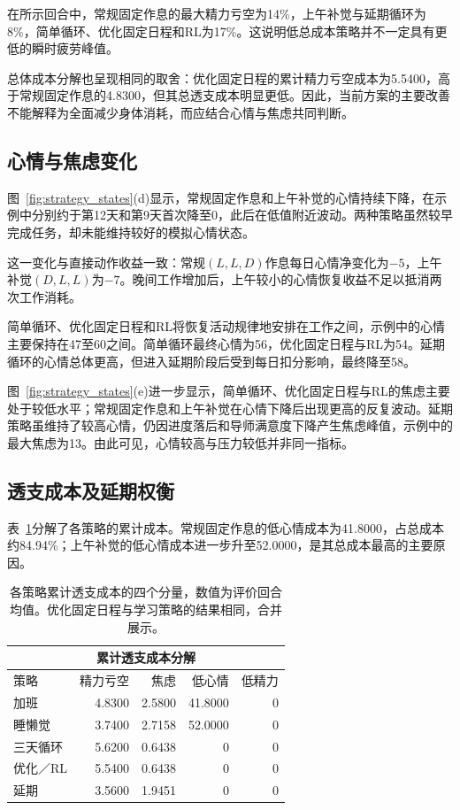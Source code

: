 \documentclass[journal]{IEEEtran}
\begin{document}
在所示回合中，常规固定作息的最大精力亏空为14\%，上午补觉与延期循环为8\%，简单循环、优化固定日程和RL为17\%。这说明低总成本策略并不一定具有更低的瞬时疲劳峰值。

总体成本分解也呈现相同的取舍：优化固定日程的累计精力亏空成本为5.5400，高于常规固定作息的4.8300，但其总透支成本明显更低。因此，当前方案的主要改善不能解释为全面减少身体消耗，而应结合心情与焦虑共同判断。

\subsection{心情与焦虑变化}

图~\ref{fig:strategy_states}(d)显示，常规固定作息和上午补觉的心情持续下降，在示例中分别约于第12天和第9天首次降至0，此后在低值附近波动。两种策略虽然较早完成任务，却未能维持较好的模拟心情状态。

这一变化与直接动作收益一致：常规$(L,L,D)$作息每日心情净变化为$-5$，上午补觉$(D,L,L)$为$-7$。晚间工作增加后，上午较小的心情恢复收益不足以抵消两次工作消耗。

简单循环、优化固定日程和RL将恢复活动规律地安排在工作之间，示例中的心情主要保持在47至60之间。简单循环最终心情为56，优化固定日程与RL为54。延期循环的心情总体更高，但进入延期阶段后受到每日扣分影响，最终降至58。

图~\ref{fig:strategy_states}(e)进一步显示，简单循环、优化固定日程与RL的焦虑主要处于较低水平；常规固定作息和上午补觉在心情下降后出现更高的反复波动。延期策略虽维持了较高心情，仍因进度落后和导师满意度下降产生焦虑峰值，示例中的最大焦虑为13。由此可见，心情较高与压力较低并非同一指标。

\subsection{透支成本及延期权衡}

表~\ref{tab:components}分解了各策略的累计成本。常规固定作息的低心情成本为41.8000，占总成本约84.94\%；上午补觉的低心情成本进一步升至52.0000，是其总成本最高的主要原因。

\begin{table}[ht]
\centering
\small
\setlength{\tabcolsep}{3pt}
\begin{tabular*}{\columnwidth}{@{\extracolsep{\fill}}lrrrr@{}}
\multicolumn{5}{c}{\textsc{累计透支成本分解}} \\
\hline\hline
策略 & 精力亏空 & 焦虑 & 低心情 & 低精力\\
\hline
加班 & 4.8300 & 2.5800 & 41.8000 & 0\\
睡懒觉 & 3.7400 & 2.7158 & 52.0000 & 0\\
三天循环 & 5.6200 & 0.6438 & 0 & 0\\
优化／RL & 5.5400 & 0.6438 & 0 & 0\\
延期 & 3.5600 & 1.9451 & 0 & 0\\
\hline\hline
\end{tabular*}
\caption{各策略累计透支成本的四个分量，数值为评价回合均值。优化固定日程与学习策略的结果相同，合并展示。}
\label{tab:components}
\end{table}
\end{document}
